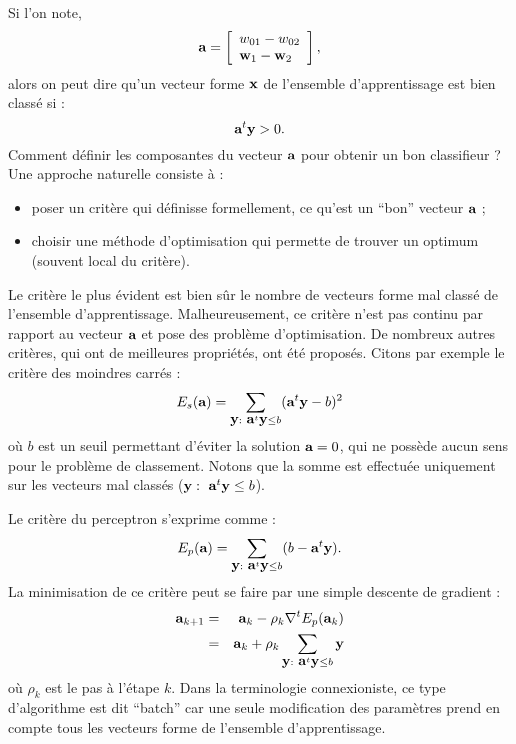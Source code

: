 Si l'on note,
$$
\mbox{\bf a} = \left [ 
\begin{array}{l}
w_{01}-w_{02}\\
\mbox{\bf w}_1-\mbox{\bf w}_2\\
\end{array}
\right ] ,
$$
alors on peut dire qu'un vecteur forme $\mbox{\bf x}$ de l'ensemble d'apprentissage 
est bien class\'e si  :
$$
\mbox{\bf a}^t \mbox{\bf y} > 0.
$$
Comment d\'efinir les composantes du vecteur $\mbox{\bf a}$ pour obtenir un bon 
classifieur ? Une approche naturelle consiste \`a :
\begin{itemize}
\item 
poser un crit\`ere qui d\'efinisse  formellement, ce qu'est un ``bon'' vecteur $\mbox{\bf a}$ ;
\item
choisir une m\'ethode d'optimisation qui permette de trouver un optimum (souvent local du 
crit\`ere).
\end{itemize}
Le crit\`ere le plus \'evident est bien s\^ur le nombre 
de vecteurs forme mal class\'e de l'ensemble 
d'apprentissage. Malheureusement, ce crit\`ere n'est pas continu par rapport
au vecteur $\mbox{\bf a}$ et pose des probl\`eme d'optimisation. De nombreux
autres crit\`eres, qui ont de meilleures propri\'et\'es,  ont \'et\'e propos\'es.
Citons par exemple le crit\`ere des moindres carr\'es :
$$
E_s(\mbox{\bf a})=\sum_{\mbox{\bf y} : \  \mbox{\bf a}^t \mbox{\bf y} \leq  b }  (\mbox{\bf a}^t \mbox{\bf y}- b)^2
$$
o\`u $b$ est un seuil permettant d'\'eviter la solution $\mbox{\bf a}=0$, qui ne 
poss\`ede aucun sens pour le probl\`eme de classement. Notons que la somme
est effectu\'ee uniquement sur les vecteurs mal class\'es ($\mbox{\bf y} : \  \mbox{\bf a}^t \mbox{\bf y} \leq  b$).

Le crit\`ere du perceptron  s'exprime comme :
$$
E_p(\mbox{\bf a})=\sum_{\mbox{\bf y} : \  \mbox{\bf a}^t \mbox{\bf y} \leq  b }  (b-\mbox{\bf a}^t \mbox{\bf y}).
$$
La minimisation de ce crit\`ere peut se faire par une simple descente de gradient :
\begin{eqnarray*}
\mbox{\bf a}_{k+1} & = & \mbox{\bf a}_k - \rho_k \nabla^t E_p(\mbox{\bf a}_k)\\ 
          & = & \mbox{\bf a}_k + \rho_k \sum_{\mbox{\bf y} : \  \mbox{\bf a}^t \mbox{\bf y} \leq  b } \mbox{\bf y}
\end{eqnarray*}
o\`u $\rho_k$ est le pas \`a l'\'etape $k$. Dans la terminologie connexioniste,
ce type d'algorithme est dit ``batch'' car une seule modification des param\`etres
prend en compte tous les vecteurs forme de l'ensemble d'apprentissage.

